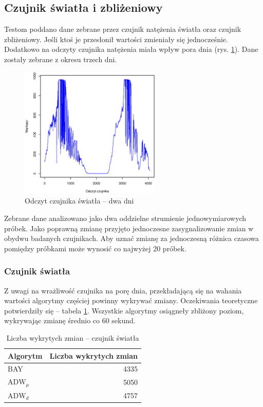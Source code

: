 \subsection{Czujnik światła i zbliżeniowy}
Testom poddano dane zebrane przez czujnik natężenia światła oraz czujnik zbliżeniowy.
Jeśli ktoś je przesłonił wartości zmieniały się jednocześnie.
Dodatkowo na odczyty czujnika natężenia miała wpływ pora dnia (rys. \ref{fig:DeviceLightRes}).
Dane zostały zebrane z okresu trzech dni.
\begin{figure}[htbp]
  \centering
  \includegraphics[width=0.6\textwidth]{img/ch-5-device-light}
  \caption{Odczyt czujnika światła -- dwa dni}
  \label{fig:DeviceLightRes}
\end{figure}

Zebrane dane analizowano jako dwa oddzielne strumienie jednowymiarowych próbek.
Jako poprawną zmianę przyjęto jednoczesne zasygnalizowanie zmian w obydwu badanych czujnikach.
Aby uznać zmianę za jednoczesną różnica czasowa pomiędzy próbkami może wynosić co najwyżej 20 próbek.

\subsubsection*{Czujnik światła}
Z uwagi na wrażliwość czujnika na porę dnia,
przekładającą się na wahania wartości algorytmy częściej powinny wykrywać zmiany.
Oczekiwania teoretyczne potwierdziły się -- tabela \ref{tab:LightResutl}.
Wszystkie algorytmy osiągneły zbliżony poziom, wykrywając zmianę średnio co 60 sekund.
\begin{table}[h]
  \label{tab:LightResutl}
  \centering
  \begin{tabular}{l r }
    Algorytm & \multicolumn{1}{l}{Liczba wykrytych zmian} \\
    \hline
    BAY & 4335  \\
    $\mbox{ADW}_{\mu}$ & 5050 \\
    $\mbox{ADW}_{d}$ & 4757  \\
  \end{tabular}
  \caption{Liczba wykrytych zmian -- czujnik światła}
\end{table}
\clearpage
